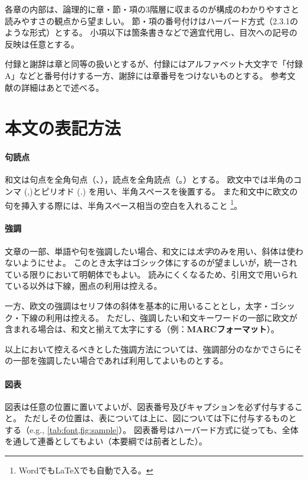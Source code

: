 		各章の内部は、論理的に章・節・項の3階層に収まるのが構成のわかりやすさと読みやすさの観点から望ましい。
		節・項の番号付けはハーバード方式（2.3.1のような形式）とする。
		小項以下は箇条書きなどで適宜代用し、目次への記号の反映は任意とする。

		付録と謝辞は章と同等の扱いとするが、付録にはアルファベット大文字で「付録A」などと番号付けする一方、謝辞には章番号をつけないものとする。
		参考文献の詳細はあとで述べる。

	\section{本文の表記方法}
		\label{sec:writing_manner}

		\paragraph{句読点}
			\label{par:punct}

			和文は句点を全角句点（、），読点を全角読点（。）とする。
			欧文中では半角のコンマ (,)とピリオド (.) を用い、半角スペースを後置する。
			また和文中に欧文の句を挿入する際には、半角スペース相当の空白を入れること
			\footnote{WordでもLaTeXでも自動で入る。}。

		\paragraph{強調}
			\label{par:inline_markup}

			文章の一部、単語や句を強調したい場合、和文には\emph{太字}のみを用い、斜体は使わないようにせよ。
			このとき太字はゴシック体にするのが望ましいが，統一されている限りにおいて明朝体でもよい。
			読みにくくなるため、引用文で用いられている以外は下線，圏点の利用は控える。

			一方、欧文の強調はセリフ体の斜体を基本的に用いることとし，太字・ゴシック・下線の利用は控える。
			ただし、強調したい和文キーワードの一部に欧文が含まれる場合は、和文と揃えて太字にする（例：\textbf{MARCフォーマット}）。

			以上において控えるべきとした強調方法については、強調部分のなかでさらにその一部を強調したい場合であれば利用してよいものとする。

		\paragraph{図表}
			\label{par:fig_tab}

			図表は任意の位置に置いてよいが、図表番号及びキャプションを必ず付与すること。
			ただしその位置は、表については上に、図については下に付与するものとする（e.g., \cref{tab:font,fig:sample}）。
			図表番号はハーバード方式に従っても、全体を通して連番としてもよい（本要綱では前者とした）。

